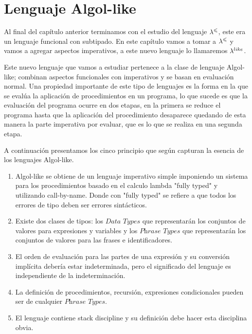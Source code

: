 \chapter{Lenguaje Algol-like}
\label{chap:algollike}

Al final del cap\'itulo anterior terminamos con el estudio
del lenguaje $\lambda^{\leqslant}$, este era un lenguaje funcional con subtipado.
En este cap\'itulo vamos a tomar a $\lambda^{\leqslant}$ y vamos a agregar
aspectos imperativos, a este nuevo lenguaje lo llamaremos $\lambda^{like}$.

Este nuevo lenguaje que vamos a estudiar pertenece a la clase
de lenguaje Algol-like; combinan
aspectos funcionales con imperativos y se basan en evaluaci\'on
normal. Una propiedad importante de este tipo de lenguajes es
la forma en la que se eval\'ua la aplicaci\'on de procedimientos
en un programa, lo que sucede es que la evaluaci\'on del programa
ocurre en dos etapas, en la primera se reduce el programa hasta que
la aplicaci\'on del procedimiento desaparece quedando de esta manera 
la parte imperativa por evaluar, que es lo que se realiza en una segunda
etapa.

A continuaci\'on presentamos los cinco principio que seg\'un \cite{essenceofalgol}
capturan la esencia de los lenguajes Algol-like.

\begin{enumerate}
\item Algol-like se obtiene de un lenguaje imperativo simple imponiendo un
sistema para los procedimientos basado en el calculo lambda "fully typed" y utilizando
call-by-name. Donde con "fully typed" se refiere a que todos los errores de 
tipo deben ser errores sint\'acticos.

\item Existe dos clases de tipos: los $\textit{Data Types}$ que representar\'an los 
conjuntos de valores para expresiones y variables y los $\textit{Phrase Types}$ que
representar\'an los conjuntos de valores para las frases e identificadores.

\item El orden de evaluaci\'on para las partes de una expresi\'on y su
conversi\'on impl\'icita deber\'ia estar indeterminada, pero el significado
del lenguaje es independiente de la indeterminaci\'on.

\item La definici\'on de procedimientos, recursi\'on, expresiones condicionales
pueden ser de cualquier $\textit{Phrase Types}$.

\item El lenguaje contiene stack discipline y su definici\'on debe hacer esta disciplina
obvia.

\end{enumerate}

